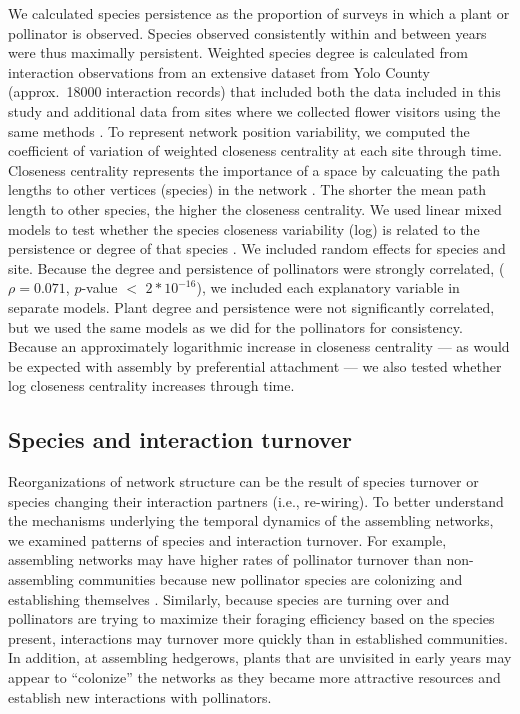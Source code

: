 \documentclass[12pt]{article}
\begin{document}
We calculated species persistence as the proportion of surveys in
which a plant or pollinator is observed. Species observed consistently
within and between years were thus maximally persistent. Weighted
species degree is calculated from interaction observations from an
extensive dataset from Yolo County (approx.~18000 interaction records)
that included both the data included in this study and additional data
from sites where we collected flower visitors using the same methods
\citep{mgonigle-2015-x, ponisio2015farm}. To represent network
position variability, we computed the coefficient of variation of
weighted closeness centrality \citep{freeman1978centrality} at each
site through time. Closeness centrality represents the importance of a
space by calcuating the path lengths to other vertices (species) in
the network \citep{freeman1978centrality}. The shorter the mean path
length to other species, the higher the closeness centrality. We used
linear mixed models to test whether the species closeness variability
(log) is related to the persistence or degree of that species
\citep{lme4, lmetest}. We included random effects for species and
site. Because the degree and persistence of pollinators were strongly
correlated, ($\rho = 0.071$, $p$-value $<$ $2*10^{-16}$), we included
each explanatory variable in separate models. Plant degree and
persistence were not significantly correlated, but we used the same
models as we did for the pollinators for consistency.  Because an
approximately logarithmic increase in closeness centrality --- as
would be expected with assembly by preferential attachment --- we also
tested whether log closeness centrality increases through time.

\subsection*{Species and interaction turnover}

Reorganizations of network structure can be the result of species
turnover or species changing their interaction partners (i.e.,
re-wiring). To better understand the mechanisms underlying the
temporal dynamics of the assembling networks, we examined patterns of
species and interaction turnover. For example, assembling networks may
have higher rates of pollinator turnover than non-assembling
communities because new pollinator species are colonizing and
establishing themselves \citep{mgonigle-2015-x}. Similarly, because
species are turning over and pollinators are trying to maximize their
foraging efficiency based on the species present, interactions may
turnover more quickly than in established communities. In addition, at
assembling hedgerows, plants that are unvisited in early years may
appear to ``colonize'' the networks as they became more attractive
resources and establish new interactions with pollinators.
\end{document}
